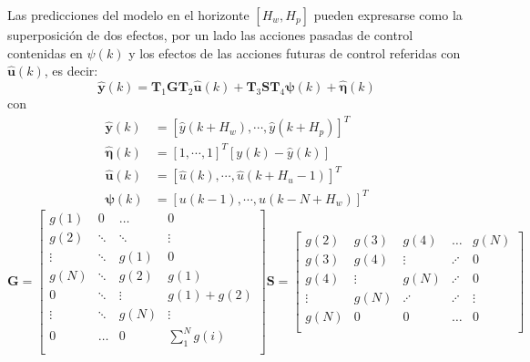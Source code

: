 Las predicciones del modelo en el horizonte $[H_w,H_p]$ pueden expresarse como la superposici{\'o}n de dos
efectos, por un lado las acciones pasadas de control contenidas en $\psi(k)$ y los efectos de las acciones
futuras de control referidas con $\mathbf{\hat{u}}(k)$, es decir:
\begin{equation}
    \hat{\mathbf{y}}(k)=\mathbf{T}_{1}\mathbf{GT}_{2}\mathbf{\hat{u}}(k)+
                        \mathbf{T}_{3}\mathbf{ST}_{4}\mathbf{\psi}(k)+
                        \mathbf{\hat{\eta}}(k)
\end{equation}
con
\begin{align}
         \hat{\mathbf{y}}(k) & = \left[\hat{y}(k+H_w),\cdots,\hat{y}(k+H_p)\right]^{T}   \\
      \mathbf{\hat{\eta}}(k) & = \left[1,\cdots,1\right]^{T}\left[y(k)-\hat{y}(k)\right] \\
         \mathbf{\hat{u}}(k) & = \left[\hat{u}(k),\cdots,\hat{u}(k+H_{u}-1)\right]^{T}   \\
            \mathbf{\psi}(k) & = \left[u(k-1),\cdots,u(k-N+H_w)\right]^{T}
\end{align}
\begin{equation}
    \mathbf{G}=\left[
\begin{array}{cccc}
  g(1)    & 0       &  \ldots & 0               \\
  g(2)    & \ddots  &  \ddots & \vdots          \\
  \vdots  & \ddots  & g(1)    & 0               \\
  g(N)    & \ddots  & g(2)    & g(1)            \\
  0       & \ddots  & \vdots  & g(1)+g(2)       \\
  \vdots  & \ddots  & g(N)    & \vdots          \\
  0       & \ldots  & 0       & \sum^{N}_{1}g(i)\\
\end{array}
\right] \mathbf{S}=\left[
\begin{array}{ccccc}
  g(2)   & g(3)   & g(4)    & \ldots  & g(N)\\
  g(3)   & g(4)   & \vdots  & \iddots & 0         \\
  g(4)   & \vdots & g(N)    & \iddots & 0         \\
  \vdots & g(N)   & \iddots & \iddots & \vdots    \\
  g(N)   & 0      & 0       & \ldots  & 0         \\
\end{array}
\right]
\end{equation}
